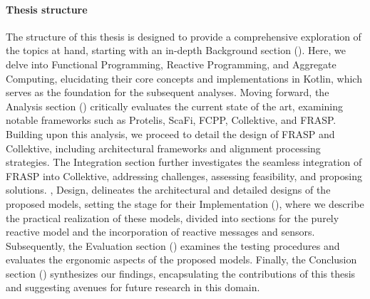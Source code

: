 \paragraph{Thesis structure}

The structure of this thesis is designed to provide a comprehensive exploration of the topics at hand, starting with an in-depth Background section (). Here, we delve into Functional Programming, Reactive Programming, and Aggregate Computing, elucidating their core concepts and implementations in Kotlin, which serves as the foundation for the subsequent analyses. Moving forward, the Analysis section () critically evaluates the current state of the art, examining notable frameworks such as Protelis, ScaFi, FCPP, Collektive, and FRASP. Building upon this analysis, we proceed to detail the design of FRASP and Collektive, including architectural frameworks and alignment processing strategies. The Integration section further investigates the seamless integration of FRASP into Collektive, addressing challenges, assessing feasibility, and proposing solutions. , Design, delineates the architectural and detailed designs of the proposed models, setting the stage for their Implementation (), where we describe the practical realization of these models, divided into sections for the purely reactive model and the incorporation of reactive messages and sensors. Subsequently, the Evaluation section () examines the testing procedures and evaluates the ergonomic aspects of the proposed models. Finally, the Conclusion section () synthesizes our findings, encapsulating the contributions of this thesis and suggesting avenues for future research in this domain.
